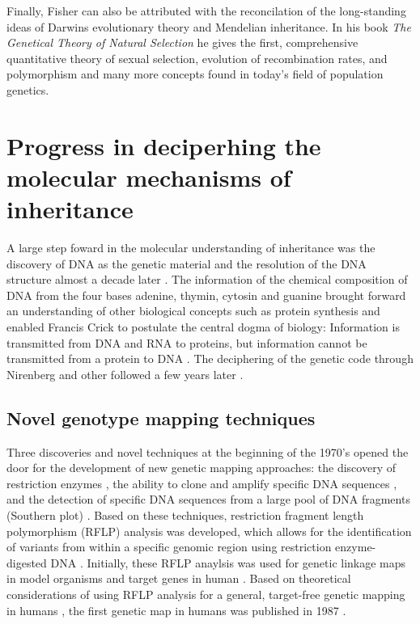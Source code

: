 Finally, Fisher can also be attributed with the reconcilation of the long-standing ideas of Darwins evolutionary theory and Mendelian inheritance. In his book \textit{The Genetical Theory of Natural Selection} he gives the first, comprehensive quantitative theory of sexual selection, evolution of recombination rates, and polymorphism and many more concepts found in today's field of population genetics. 

\section{Progress in deciperhing the molecular mechanisms of inheritance}
A large step foward in the molecular understanding of inheritance was the discovery of DNA as the genetic material \citep{Avery1944} and the resolution of the DNA structure almost a decade later \citep{Watson1953}. The information of the chemical composition of DNA from the four bases adenine, thymin, cytosin and guanine brought forward an understanding of other biological concepts such as protein synthesis and enabled Francis Crick to postulate the central dogma of biology:  Information is transmitted from DNA and RNA to proteins, but information cannot be transmitted from a protein to DNA \citep{Crick1958}. The deciphering of the genetic code through Nirenberg and other followed a few years later \citep{Nirenberg1961,Crick1961,Matthaei1962}.  

\subsection{Novel genotype mapping techniques}
Three discoveries and novel techniques at the beginning of the 1970's opened the door for the development of new genetic mapping approaches: the discovery of restriction enzymes \citep{Smith1970,Morrow1972}, the ability to clone and amplify specific DNA sequences \citep{Jackson1972,Cohen1973}, and the detection of specific DNA sequences from a large pool of DNA fragments (Southern plot) \citep{Southern1975}. Based on these techniques, restriction fragment length polymorphism (RFLP) analysis was developed, which allows for the identification of variants from within a specific genomic region using restriction enzyme-digested DNA \citep{Grodzicker1974,Botstein1980}. Initially, these RFLP anaylsis was used for genetic linkage maps in model organisms \citep{Goodman1977,Cameron1979} and target genes in human  \citep{Kan1978,Jeffreys1979,Tuan1979}.  Based on theoretical considerations of using RFLP analysis for a general, target-free genetic mapping in humans \citep{Botstein1980}, the first genetic map in humans was published in 1987 \citep{Donis-Keller1987}. 

